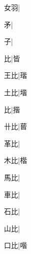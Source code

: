 \begin{multicols}{2}
{{\cjk{}{\cnsym{}　}女羽}\mktsJzrVerticalBar{}{\cjk{}{\cnsym{}　}{\cnsym{}　}{\cnsym{}　}}|{}\par
{\cjk{}{\cnsym{}　}{\cnsym{}　}矛}\mktsJzrVerticalBar{}{\cjk{}{\cnsym{}　}{\cnsym{}　}{\cnsym{}　}}|{}\par
{\cjk{}{\cnsym{}　}{\cnsym{}　}子}\mktsJzrVerticalBar{}{\cjk{}{\cnsym{}　}{\cnsym{}　}{\cnsym{}　}}|{}\par
{\cjk{}{\cnsym{}　}{\cnsym{}　}比}\mktsJzrVerticalBar{}{\cjk{}{\cnsym{}　}{\cnsym{}　}{\cnsym{}　}}|{\cjk{}皆}\par
{\cjk{}{\cnsym{}　}王比}\mktsJzrVerticalBar{}{\cjk{}{\cnsym{}　}{\cnsym{}　}{\cnsym{}　}}|{\cjk{}瑎}\par
{\cjk{}{\cnsym{}　}土比}\mktsJzrVerticalBar{}{\cjk{}{\cnsym{}　}{\cnsym{}　}{\cnsym{}　}}|{\cjk{}堦}\par
{比}\mktsJzrVerticalBar{}{\cjk{}{\cnsym{}　}{\cnsym{}　}{\cnsym{}　}}|{\cjk{}揩}\par
{\cjk{}{\cnsym{}　}卄比}\mktsJzrVerticalBar{}{\cjk{}{\cnsym{}　}{\cnsym{}　}{\cnsym{}　}}|{\cjk{}蒈}\par
{\cjk{}{\cnsym{}　}革比}\mktsJzrVerticalBar{}{\cjk{}{\cnsym{}　}{\cnsym{}　}{\cnsym{}　}}|{}\par
{\cjk{}{\cnsym{}　}木比}\mktsJzrVerticalBar{}{\cjk{}{\cnsym{}　}{\cnsym{}　}{\cnsym{}　}}|{\cjk{}楷}\par
{\cjk{}{\cnsym{}　}馬比}\mktsJzrVerticalBar{}{\cjk{}{\cnsym{}　}{\cnsym{}　}{\cnsym{}　}}|{}\par
{\cjk{}{\cnsym{}　}車比}\mktsJzrVerticalBar{}{\cjk{}{\cnsym{}　}{\cnsym{}　}{\cnsym{}　}}|{}\par
{\cjk{}{\cnsym{}　}石比}\mktsJzrVerticalBar{}{\cjk{}{\cnsym{}　}{\cnsym{}　}{\cnsym{}　}}|{}\par
{\cjk{}{\cnsym{}　}山比}\mktsJzrVerticalBar{}{\cjk{}{\cnsym{}　}{\cnsym{}　}{\cnsym{}　}}|{}\par
{\cjk{}{\cnsym{}　}口比}\mktsJzrVerticalBar{}{\cjk{}{\cnsym{}　}{\cnsym{}　}{\cnsym{}　}}|{\cjk{}喈}\par
}
\end{multicols}
